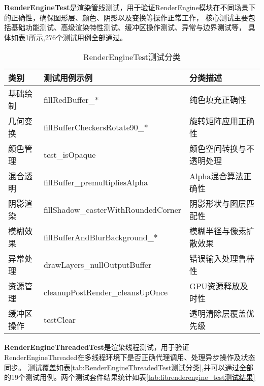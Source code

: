 \textbf{RenderEngineTest}是渲染管线测试，用于验证RenderEngine模块在不同场景下的正确性，确保图形层、颜色、阴影以及变换等操作正常工作，
核心测试主要包括基础功能测试、高级渲染特性测试、缓冲区操作测试、异常与边界测试等，
具体如表\ref{tab:RenderEngineTest测试分类}所示,276个测试用例全部通过。
    \begin{table}[H]
        \centering
        \caption{RenderEngineTest测试分类}
        \label{tab:RenderEngineTest测试分类}
        \begin{tabular}{lll}
          \toprule
          类别 & 测试用例示例 & 分类描述 \\
          \midrule
            基础绘制 & fillRedBuffer\_* & 纯色填充正确性 \\
            几何变换 & fillBufferCheckersRotate90\_* & 旋转矩阵应用正确性 \\
            颜色管理 & test\_isOpaque & 颜色空间转换与不透明处理 \\
            混合透明 & fillBuffer\_premultipliesAlpha & Alpha混合算法正确性 \\
            阴影渲染 & fillShadow\_casterWithRoundedCorner & 阴影形状与图层匹配性 \\
            模糊效果 & fillBufferAndBlurBackground\_* & 模糊半径与像素扩散效果 \\
            异常处理 & drawLayers\_nullOutputBuffer & 错误输入处理鲁棒性 \\
            资源管理 & cleanupPostRender\_cleansUpOnce & GPU资源释放及时性 \\
            缓冲区操作 & testClear & 透明清除层覆盖优先级 \\
          \bottomrule
        \end{tabular}
        \note{}
    \end{table}

\textbf{RenderEngineThreadedTest}是渲染线程测试，用于验证RenderEngineThreaded在多线程环境下是否正确代理调用、处理异步操作及状态同步。
测试覆盖如表\ref{tab:RenderEngineThreadedTest测试分类},并可以通过全部的19个测试用例。两个测试套件结果统计如表\ref{tab:librenderengine_test测试结果}

